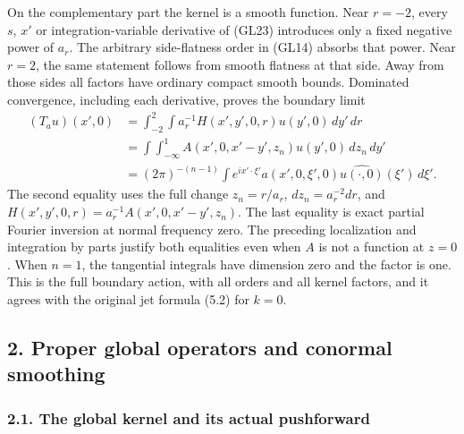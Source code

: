 \documentclass[
  11pt,
]{article}
\makeatletter
\let\ReaderOriginalAnchorStart\hyper@anchorstart
\let\ReaderOriginalAnchorEnd\hyper@anchorend
\let\ReaderPendingAliases\@empty
\def\ReaderArmAliases#1{\gdef\ReaderPendingAliases{#1}}
\def\hyper@anchorstart#1{\ReaderIfNativeAnchorTF{#1}{\ReaderPendingAliases\global\let\ReaderPendingAliases\@empty}{}\ReaderOriginalAnchorStart{#1}}
\makeatother
\begin{document}
On the complementary part the kernel is a smooth function. Near
\(r=-2\), every \(s\), \(x'\) or integration-variable derivative of
(GL23) introduces only a fixed negative power of \(a_r\). The arbitrary
side-flatness order in (GL14) absorbs that power. Near \(r=2\), the same
statement follows from smooth flatness at that side. Away from those
sides all factors have ordinary compact smooth bounds. Dominated
convergence, including each derivative, proves the boundary limit \[
 \begin{aligned}
 (T_a u)(x',0)
 &=\int_{-2}^{2}\int a_r^{-1}H(x',y',0,r)u(y',0)\,dy'\,dr\\
 &=\int\!\int_{-\infty}^{1}
       A(x',0,x'-y',z_n)u(y',0)\,dz_n\,dy'\\
 &=(2\pi)^{-(n-1)}\int e^{ix'\cdot\xi'}
       a(x',0,\xi',0)\widehat{u(\cdot,0)}(\xi')\,d\xi'.
 \end{aligned}
 \tag{GL24}
\] The second equality uses the full change \(z_n=r/a_r\),
\(dz_n=a_r^{-2}dr\), and \(H(x',y',0,r)=a_r^{-1}A(x',0,x'-y',z_n)\). The
last equality is exact partial Fourier inversion at normal frequency
zero. The preceding localization and integration by parts justify both
equalities even when \(A\) is not a function at \(z=0\). When \(n=1\),
the tangential integrals have dimension zero and the factor is one. This
is the full boundary action, with all orders and all kernel factors, and
it agrees with the original jet formula (5.2) for \(k=0\).

\ReaderArmAliases{\ReaderOriginalAnchorStart{AN03-GBD-002}\ReaderOriginalAnchorEnd\begingroup\expandafter\def\csname @currentHref\endcsname{AN03-GBD-002}\label{AN03-GBD-002}\endgroup\ReaderOriginalAnchorStart{2-proper-global-operators-and-conormal-smoothing}\ReaderOriginalAnchorEnd\begingroup\expandafter\def\csname @currentHref\endcsname{2-proper-global-operators-and-conormal-smoothing}\label{2-proper-global-operators-and-conormal-smoothing}\endgroup}
\subsection{2. Proper global operators and conormal
smoothing}\label{proper-global-operators-and-conormal-smoothing}

\subsubsection{2.1. The global kernel and its actual
pushforward}\label{the-global-kernel-and-its-actual-pushforward}
\end{document}
